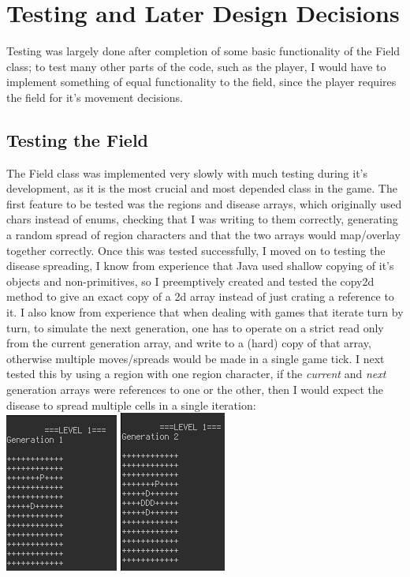 \documentclass[pdftex,12pt,a4paper]{article}
\begin{document}
	\section{Testing and Later Design Decisions}
		Testing was largely done after completion of some basic functionality of the Field class; to test many other parts of the code, such as the player, I would have to implement something of equal functionality to the field, since the player requires the field for it's movement decisions.
		\subsection{Testing the Field}
			The Field class was implemented very slowly with much testing during it's development, as it is the most crucial and most depended class in the game. The first feature to be tested was the regions and disease arrays, which originally used chars instead of enums, checking that I was writing to them correctly, generating a random spread of region characters and that the two arrays would map/overlay together correctly. Once this was tested successfully, I moved on to testing the disease spreading, I know from experience that Java used shallow copying of it's objects and non-primitives, so I preemptively created and tested the copy2d method to give an exact copy of a 2d array instead of just crating a reference to it. I also know from experience that when dealing with games that iterate turn by turn, to simulate the next generation, one has to operate on a strict read only from the current generation array, and write to a (hard) copy of that array, otherwise multiple moves/spreads would be made in a single game tick. I next tested this by using a region with one region character, if the \emph{current} and \emph{next} generation arrays were references to one or the other, then I would expect the disease to spread multiple cells in a single iteration:  \\
			\includegraphics{./fig5.png}
			\includegraphics{./fig6.png}\\
\end{document}
